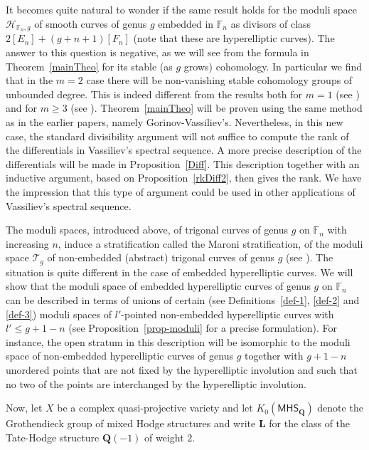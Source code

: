 \documentclass[10pt,a4paper,twoside]{amsart}
\theoremstyle{plain}
\theoremstyle{definition}
\theoremstyle{remark}
\begin{document}
It becomes quite natural to wonder if the same result holds for the moduli space $\mathcal{H}_{\mathbb{F}_n,g}$ of smooth curves of genus $g$ embedded in $\mathbb{F}_n$ as divisors of class $2[E_n]+(g+n+1)[F_n]$ 
(note that these are hyperelliptic curves). 
The answer to this question is negative, as we will see from the formula in Theorem~\ref{mainTheo} for its stable (as $g$ grows) cohomology. 
In particular we find that in the $m=2$ case there will be non-vanishing stable cohomology groups of unbounded degree. This is indeed different from the results both for $m=1$ (see \cite[IV.2]{ZheThesis}) and for $m\geq3$ (see \cite[Proposition~1.1]{Zhe}). Theorem~\ref{mainTheo} will be proven using the same method as in the earlier papers, namely Gorinov-Vassiliev's. Nevertheless, in this new case, the standard divisibility argument will not suffice to compute the rank of the differentials in Vassiliev's spectral sequence. A more precise description of the differentials will be made in Proposition~\ref{Diff}. This description together with an inductive argument, based on Proposition~\ref{rkDiff2}, then gives the rank. We have the impression that this type of argument could be used in other applications of Vassiliev's spectral sequence.

The moduli spaces, introduced above, of trigonal curves of genus $g$ on $\mathbb{F}_n$ with increasing $n$, induce a stratification called the Maroni stratification, of the moduli space $\mathcal T_g$ of non-embedded (abstract) trigonal curves of genus $g$ (see \cite[Section 5]{Zhe}). The situation is quite different in the case of embedded hyperelliptic curves. We will show that the moduli space of embedded hyperelliptic curves of genus $g$ on $\mathbb{F}_n$ can be described in terms of unions of certain (see Definitions~\ref{def-1}, \ref{def-2} and \ref{def-3}) moduli spaces of $l'$-pointed non-embedded hyperelliptic curves with $l'\leq g+1-n$ (see Proposition~\ref{prop-moduli} for a precise formulation). For instance, the open stratum in this description will be isomorphic to the moduli space of non-embedded hyperelliptic curves of genus $g$ together with $g+1-n$ unordered points that are not fixed by the hyperelliptic involution and such that no two of the points are interchanged by the hyperelliptic involution. 

Now, let $X$ be a complex quasi-projective variety and let $K_0(\mathsf{MHS}_{\mathbf{Q}})$ denote the Grothendieck group of mixed Hodge structures and write $\mathbf{L}$ for the class of the Tate-Hodge structure $\mathbf{Q}(-1)$ of weight $2$. 
\end{document}
